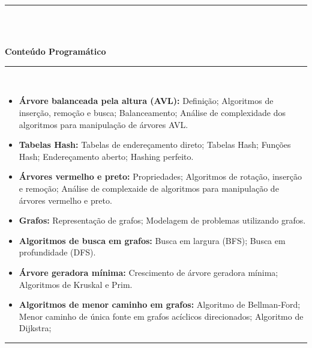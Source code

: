 \noindent\rule{16.5cm}{0.4pt}\\
\\
\vspace{-12mm}
\begin{center}\textbf{Conteúdo Programático}\end{center}
\vspace{-5mm}
\noindent\rule{16.5cm}{0.4pt}
\\
\begin{itemize}
 \item \textbf{\'Arvore balanceada pela altura (AVL):} Defini\c{c}\~ao; Algoritmos de inser\c{c}\~ao, remo\c{c}\~ao e busca; Balanceamento; An\'alise de complexidade dos algoritmos para manipula\c{c}\~ao de \'arvores AVL.


 \item \textbf{Tabelas Hash:} Tabelas de endere\c{c}amento direto; Tabelas Hash; Fun\c{c}\~oes Hash; Endere\c{c}amento aberto; Hashing perfeito.

 \item \textbf{\'Arvores vermelho e preto:} Propriedades; Algoritmos de rota\c{c}\~ao, inser\c{c}\~ao e remo\c{c}\~ao; An\'alise de complexaide de algoritmos para manipula\c{c}\~ao de \'arvores vermelho e preto.

 \item \textbf{Grafos:} Representa\c{c}\~ao de grafos; Modelagem de problemas utilizando grafos.

 \item \textbf{Algoritmos de busca em grafos:} Busca em largura (BFS); Busca em profundidade (DFS).

 \item \textbf{\'Arvore geradora m\'inima:} Crescimento de \'arvore geradora m\'inima; Algoritmos de Kruskal e Prim.

 \item \textbf{Algoritmos de menor caminho em grafos:} Algoritmo de Bellman-Ford; Menor caminho de \'unica fonte em grafos ac\'iclicos direcionados; Algoritmo de Dijkstra; 

\end{itemize}
\noindent\rule{16.5cm}{0.4pt}\\
\\
